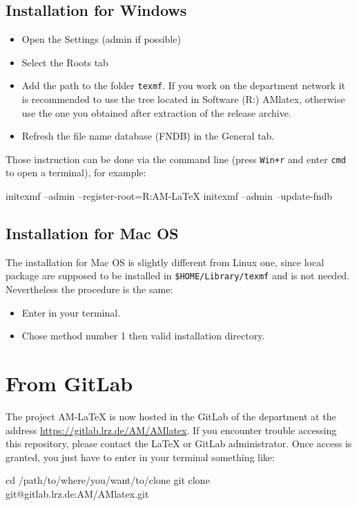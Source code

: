 \documentclass[12pt]{AMdocumentation}
\providecommand{\AMlatex}{AM-\LaTeX{}\xspace}
\begin{document}
\subsection{Installation for Windows}
\label{sec:release:windows}

\begin{itemize}
\item Open the \miktex Settings (admin if possible)
\item Select the Roots tab
\item Add the path to the folder \verb|texmf|. If you work on the department network it is recommended to use the tree located in Software (R:) AMlatex, otherwise use the one you obtained after extraction of the release archive.
\item Refresh the file name database (FNDB) in the General tab.
\end{itemize}

Those instruction can be done via the command line (press \verb|Win+r| and enter \verb|cmd| to open a terminal), for example:
\begin{bashshell}
initexmf --admin --register-root=R:\AMlatex\texmf
initexmf --admin --update-fndb 
\end{bashshell}

\subsection{Installation for Mac OS}
\label{sec:release:mac}

The installation for Mac OS is slightly different from Linux one, since local package are supposed to be installed in \verb|$HOME/Library/texmf| and  is not needed. Nevertheless the procedure is the same:
\begin{itemize}
\item Enter  in your terminal.
\item Chose method number 1 then valid installation directory.
\end{itemize}

\section{From GitLab}
\label{sec:git}

The project \AMlatex is now hosted in the GitLab of the department at the address 
\url{https://gitlab.lrz.de/AM/AMlatex}. 
If you encounter trouble accessing this repository, please contact the LaTeX or GitLab administrator.
Once access is granted, you just have to enter in your terminal something like:
\begin{bashshell}
cd /path/to/where/you/want/to/clone
git clone git@gitlab.lrz.de:AM/AMlatex.git
\end{bashshell}
\end{document}
